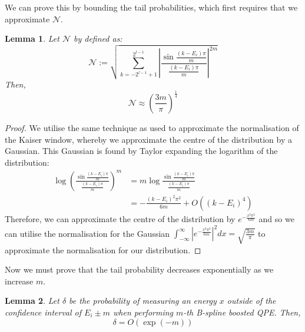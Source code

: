 \documentclass[aps,prx,twocolumn,floatfix,10pt,amssymb,amsfont,amsmath,superscriptaddress,float,nofootinbib,longbibliography,nobalancelastpage]{revtex4-2}
\newtheorem{lemma}{Lemma}[theorem]
\theoremstyle{empty}
\begin{document}
We can prove this by bounding the tail probabilities, which first requires that we approximate $\mathcal{N}$.
\begin{lemma}
    Let $\mathcal{N}$ by defined as:
    \begin{equation}
       \mathcal{N} := \sqrt{\sum_{k=-2^{l-1}+1}^{2^{l-1}} \left|\frac{\sin \frac{(k-E_i)\pi}{m}}{ \frac{(k-E_i)\pi}{m}}\right|^{2m}}
    \end{equation} 
    Then, 
    \begin{equation}
        \mathcal{N} \approx \left(\frac{3m}{\pi}\right)^{\frac{1}{4}}
    \end{equation}
    \label{lemma:bspline_norm}
\end{lemma}
\begin{proof}
    We utilise the same technique as \cite{Berry:2022ccu} used to approximate the normalisation of the Kaiser window, whereby we approximate the centre of the distribution by a Gaussian. This Gaussian is found by Taylor expanding the logarithm of the distribution:
    \begin{align}
                \log \left(\frac{\sin \frac{(k-E_i)\pi}{m}}{ \frac{(k-E_i)\pi}{m}}\right)^m &= m \log \frac{\sin \frac{(k-E_i)\pi}{m}}{ \frac{(k-E_i)\pi}{m}}\\
                &= - \frac{(k-E_i)^2 \pi^2}{6m} + O\left((k-E_i)^4\right)
    \end{align}
    Therefore, we can approximate the centre of the distribution by $e^{ - \frac{x^2 \pi^2}{6m}}$ and so we can utilise the normalisation for the Gaussian $\int_{-\infty}^{\infty}\left|e^{ - \frac{x^2 \pi^2}{6m}}\right|^2 dx = \sqrt{\frac{3m}{\pi}}$ to approximate the normalisation for our distribution.

\end{proof}
Now we must prove that the tail probability decreases exponentially as we increase $m$.
\begin{lemma}
    Let $\delta$ be the probability of measuring an energy $x$ outside of the confidence interval of $E_i\pm m$ when performing $m$-th B-spline boosted QPE. Then,
    \begin{equation}
        \delta = O\left(\exp (-m)\right)
    \end{equation}
    \label{lemma:bspline_prob}
\end{lemma}
\end{document}

